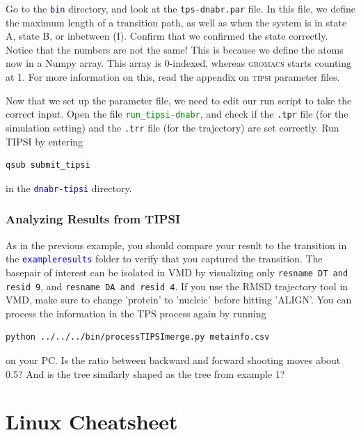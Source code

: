 \documentclass[]{article}
\begin{document}
Go to the \textcolor{blue}{\texttt{bin}} directory, and look at the \texttt{tps-dnabr.par} file. In this file, we define the maximum length of a transition path, as well as when the system is in state A, state B, or inbetween (I). Confirm that we confirmed the state correctly. Notice that the numbers are not the same! This is because we define the atoms now in a Numpy array. This array is 0-indexed, whereas \textsc{gromacs} starts counting at 1. For more information on this, read the appendix on \textsc{tipsi} parameter files.

Now that we set up the parameter file, we need to edit our run script to take the correct input. Open the file \textcolor{green}{\texttt{run\_tipsi-dnabr}}, and check if the \texttt{.tpr} file (for the simulation setting) and the \texttt{.trr} file (for the trajectory) are set correctly. Run \textsc{TIPSI} by entering
%
\begin{lstlisting}
qsub submit_tipsi
\end{lstlisting}
%
in the \textcolor{blue}{\texttt{dnabr-tipsi}} directory.

\subsubsection*{Analyzing Results from TIPSI}

As in the previous example, you should compare your result to the transition in the \textcolor{blue}{\texttt{exampleresults}} folder to verify that you captured the transition. The basepair of interest can be isolated in \textsc{VMD} by visualizing only \texttt{resname DT and resid 9}, and \texttt{resname DA and resid 4}. If you use the RMSD trajectory tool in VMD, make sure to change 'protein' to 'nucleic' before hitting 'ALIGN'. You can process the information in the TPS process again by running
%
\begin{lstlisting}
python ../../../bin/processTIPSImerge.py metainfo.csv
\end{lstlisting}
% 
on your PC. Is the ratio between backward and forward shooting moves about 0.5? And is the tree similarly shaped as the tree from example 1?

\newpage

\appendix
\section*{Linux Cheatsheet}
\setlength\parindent{0pt}
\end{document}
